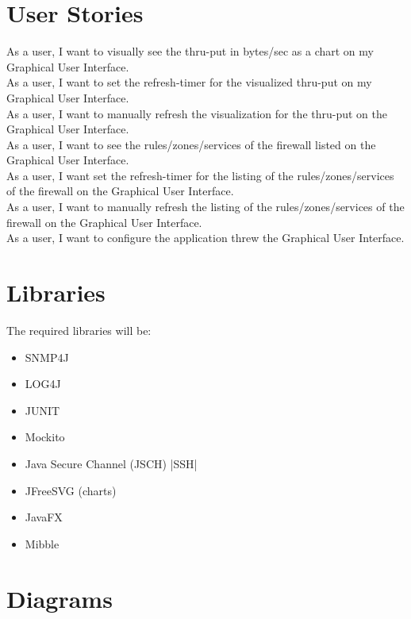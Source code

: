 \documentclass[a4paper,12pt]{scrreprt}
\begin{document}
\chapter{User Stories}
As a user, I want to visually see the thru-put in bytes/sec as a chart on my Graphical User Interface.\\

As a user, I want to set the refresh-timer for the visualized thru-put on my Graphical User Interface.\\

As a user, I want to manually refresh the visualization for the thru-put on the Graphical User Interface.\\

As a user, I want to see the rules/zones/services of the firewall listed on the Graphical User Interface.\\

As a user, I want set the refresh-timer for the listing of the rules/zones/services of the firewall on the Graphical User Interface.\\

As a user, I want to manually refresh the listing of the rules/zones/services of the firewall on the Graphical User Interface.\\

As a user, I want to configure the application threw the Graphical User Interface.\\
\chapter{Libraries}
\begin{description}
\item The required libraries will be:
\begin{itemize}
\item SNMP4J
\item LOG4J
\item JUNIT
\item Mockito
\item Java Secure Channel (JSCH) |SSH|
\item JFreeSVG (charts)
\item JavaFX
\item Mibble
\end{itemize}
\end{description}


\chapter{Diagrams}
\end{document}
